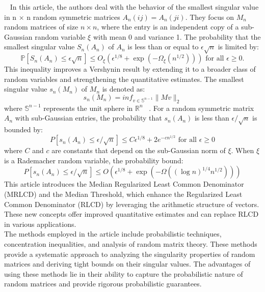 ~\cite{jain2020smallest}
In this article, the authors deal with the behavior of the smallest singular value in n $\times$ n random symmetric matrices  $A_n(ij) = A_n(ji)$.
They focus on $M_n$ random matrices of size $n\times n$, where the entry is an independent copy of a sub-Gaussian random variable $\xi$ with mean 0 and variance 1.
The probability that the smallest singular value $S_n(A_n)$ of $A_n$ is less than or equal to $\epsilon\sqrt{n}$ is limited by:
\begin{equation*}
    \mathbb{P}[S_n(A_n) \leq \epsilon \sqrt{n}] \leq O_\xi(\epsilon^{1/8} + \exp(-\Omega_\xi(n^{1/2}))) \text{ for all } \epsilon \geq 0.
\end{equation*}
This inequality improves a Vershynin result by extending it to a broader class of random variables and strengthening the quantitative estimates.
The smallest singular value $s_n(M_n)$ of $M_n$ is denoted as:
\begin{equation*}
    s_n(M_n) = inf_{v \in \mathbb{S}^{n-1}} \|Mv\|_2
\end{equation*}
where $\mathbb{S}^{n-1}$ represents the unit sphere in $\mathbb{R}^n$ ~\cite{rudelson2008littlewood}.
For a random symmetric matrix $A_n$ with sub-Gaussian entries, the probability that $s_n(A_n)$ is less than $\epsilon/\sqrt{n}$ is bounded by:
\begin{equation*}
    P[s_n(A_n)\leq \epsilon/\sqrt{n}]\leq C \epsilon^{1/8}+2e^{-c n^{1/2}} \text{ for all } \epsilon \geq 0
\end{equation*}
where $C$ and $c$ are constants that depend on the sub-Gaussian norm of $\xi$.
When $\xi$ is a Rademacher random variable, the probability bound:
\begin{equation*}
    P[s_n(A_n) \leq \epsilon / \sqrt{n}] \leq O(\epsilon^{1/8}+ \exp(-\Omega((\log{n})^{1/4}n^{1/2})))
\end{equation*}
This article introduces the Median Regularized Least Common Denominator (MRLCD) and the Median Threshold, which enhance the Regularized Least Common Denominator (RLCD) by leveraging the arithmetic structure of vectors.
These new concepts offer improved quantitative estimates and can replace RLCD in various applications.\\
The methods employed in the article include probabilistic techniques, concentration inequalities, and analysis of random matrix theory.
These methods provide a systematic approach to analyzing the singularity properties of random matrices and deriving tight bounds on their singular values.
The advantages of using these methods lie in their ability to capture the probabilistic nature of random matrices and provide rigorous probabilistic guarantees.\\
